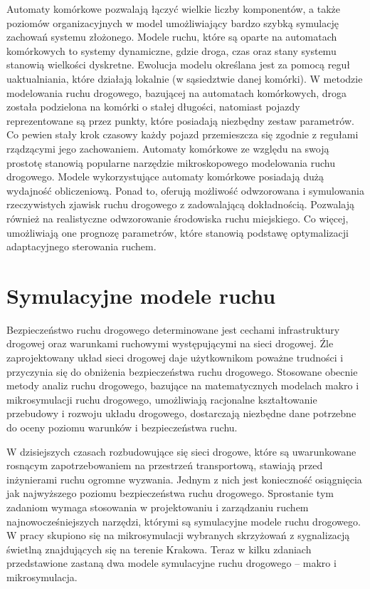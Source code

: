 \documentclass{sprawozdanie-agh}
\begin{document}
\begin{multicols}{2}
		Automaty komórkowe pozwalają łączyć wielkie liczby komponentów, a także poziomów organizacyjnych w model umożliwiający bardzo szybką symulację zachowań systemu złożonego. Modele ruchu, które są oparte na automatach komórkowych to systemy dynamiczne, gdzie droga, czas oraz stany systemu stanowią wielkości dyskretne. Ewolucja modelu określana jest za pomocą reguł uaktualniania, które działają lokalnie (w sąsiedztwie danej komórki). W metodzie modelowania ruchu drogowego, bazującej na automatach komórkowych, droga została podzielona na komórki o stałej długości, natomiast pojazdy reprezentowane są przez punkty, które posiadają niezbędny zestaw parametrów. Co pewien stały krok czasowy każdy pojazd przemieszcza się zgodnie z regułami rządzącymi jego zachowaniem. Automaty komórkowe ze względu na swoją prostotę stanowią popularne narzędzie mikroskopowego modelowania ruchu drogowego. Modele wykorzystujące automaty komórkowe posiadają dużą wydajność obliczeniową. Ponad to, oferują możliwość odwzorowana i symulowania rzeczywistych zjawisk ruchu drogowego z zadowalającą dokładnością. Pozwalają również na realistyczne odwzorowanie środowiska ruchu miejskiego. Co więcej, umożliwiają one prognozę parametrów, które stanowią podstawę optymalizacji adaptacyjnego sterowania ruchem.


		\section{Symulacyjne modele ruchu}

		Bezpieczeństwo ruchu drogowego determinowane jest cechami infrastruktury drogowej oraz warunkami ruchowymi występującymi na sieci drogowej. Źle zaprojektowany układ sieci drogowej daje użytkownikom poważne trudności i przyczynia się do obniżenia bezpieczeństwa ruchu drogowego. Stosowane obecnie metody analiz ruchu drogowego, bazujące na matematycznych modelach makro i mikrosymulacji ruchu drogowego, umożliwiają racjonalne kształtowanie przebudowy i rozwoju układu drogowego, dostarczają niezbędne dane potrzebne do oceny poziomu warunków i bezpieczeństwa ruchu.

		W dzisiejszych czasach rozbudowujące się sieci drogowe, które są uwarunkowane rosnącym zapotrzebowaniem na przestrzeń transportową, stawiają przed inżynierami ruchu ogromne wyzwania. Jednym z nich jest konieczność osiągnięcia jak najwyższego poziomu bezpieczeństwa ruchu drogowego. Sprostanie tym zadaniom wymaga stosowania w projektowaniu i zarządzaniu ruchem najnowocześniejszych narzędzi, którymi są symulacyjne modele ruchu drogowego.
		W pracy skupiono się na mikrosymulacji wybranych skrzyżowań z sygnalizacją świetlną znajdujących się na terenie Krakowa. Teraz w kilku zdaniach przedstawione zastaną dwa modele symulacyjne ruchu drogowego – makro i mikrosymulacja.


\end{multicols}
\end{document}
